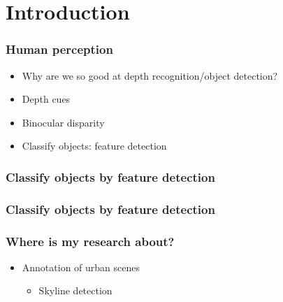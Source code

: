 \documentclass{beamer}
\begin{document}
\section[Outline]{}
\frame{\tableofcontents}

\section{Introduction}
\frame
{
	\frametitle{Human perception}
	\begin{itemize}
	\item <+-| alert@+> Why are we so good at depth recognition/object detection?
	\item <+-| alert@+> Depth cues
	\item <+-| alert@+> Binocular disparity


	\item <+-| alert@+> Classify objects: feature detection
	\end{itemize}
}

\frame
{
	\frametitle{Classify objects by feature detection}
}

\frame
{
	\frametitle{Classify objects by feature detection}
}

\frame
{
}

\frame
{
	\frametitle{Where is my research about?}
	\begin{itemize}
	\item <+-| alert@+> Annotation of urban scenes
		\begin{itemize}
			\item <+-| alert@+> Skyline detection
		\end{itemize}
	\end{itemize}
}
\end{document}
